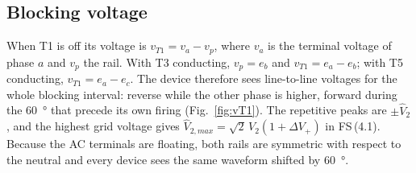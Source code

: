 \documentclass[10pt,a4paper]{scrartcl}
\newcommand{\Vll}{V_{2}}
\newcommand{\fs}[1]{\textsf{FS}\,(#1)}
\begin{document}
\subsection{Blocking voltage}\label{sec:blocking}
When T1 is off its voltage is $v_{T1} = v_a - v_p$, where $v_a$ is the terminal voltage of phase $a$ and $v_p$ the rail. With T3 conducting, $v_p = e_b$ and $v_{T1} = e_a - e_b$; with T5 conducting, $v_{T1} = e_a - e_c$. The device therefore sees line-to-line voltages for the whole blocking interval: reverse while the other phase is higher, forward during the \SI{60}{\degree} that precede its own firing (Fig.~\ref{fig:vT1}). The repetitive peaks are $\pm\hat V_2$, and the highest grid voltage gives $\hat V_{2,max} = \sqrt2\,\Vll(1+\Delta V_+)$ in \fs{4.1}. Because the AC terminals are floating, both rails are symmetric with respect to the neutral and every device sees the same waveform shifted by \SI{60}{\degree}.
\end{document}
